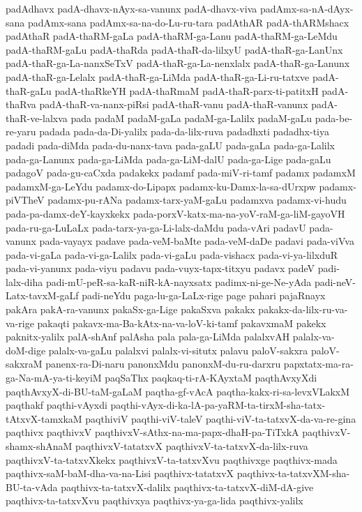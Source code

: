 {padAdhavx
padA-dhavx-nAyx-sa-vanunx
padA-dhavx-viva
padAmx-sa-nA-dAyx-sana
padAmx-sana
padAmx-sa-na-do-Lu-ru-tara
padAthAR
padA-thARMshacx
padAthaR
padA-thaRM-gaLa
padA-thaRM-ga-Lanu
padA-thaRM-ga-LeMdu
padA-thaRM-gaLu
padA-thaRda
padA-thaR-da-lilxyU
padA-thaR-ga-LanUnx
padA-thaR-ga-La-nanxSeTxV
padA-thaR-ga-La-nenxlalx
padA-thaR-ga-Lanunx
padA-thaR-ga-Lelalx
padA-thaR-ga-LiMda
padA-thaR-ga-Li-ru-tatxve
padA-thaR-gaLu
padA-thaRkeYH
padA-thaRmaM
padA-thaR-parx-ti-patitxH
padA-thaRva
padA-thaR-va-nanx-piRsi
padA-thaR-vanu
padA-thaR-vanunx
padA-thaR-ve-lalxva
pada
padaM
padaM-gaLa
padaM-ga-Lalilx
padaM-gaLu
pada-be-re-yaru
padada
pada-da-Di-yalilx
pada-da-lilx-ruva
padadhxti
padadhx-tiya
padadi
pada-diMda
pada-du-nanx-tava
pada-gaLU
pada-gaLa
pada-ga-Lalilx
pada-ga-Lanunx
pada-ga-LiMda
pada-ga-LiM-dalU
pada-ga-Lige
pada-gaLu
padagoV
pada-gu-caCxda
padakekx
padamf
pada-miV-ri-tamf
padamx
padamxM
padamxM-ga-LeYdu
padamx-do-Lipapx
padamx-ku-Damx-la-sa-dUrxpw
padamx-piVTheV
padamx-pu-rANa
padamx-tarx-yaM-gaLu
padamxva
padamx-vi-hudu
pada-pa-damx-deY-kayxkekx
pada-porxV-katx-ma-na-yoV-raM-ga-liM-gayoVH
pada-ru-ga-LuLaLx
pada-tarx-ya-ga-Li-lalx-daMdu
pada-vAri
padavU
pada-vanunx
pada-vayayx
padave
pada-veM-baMte
pada-veM-daDe
padavi
pada-viVva
pada-vi-gaLa
pada-vi-ga-Lalilx
pada-vi-gaLu
pada-vishacx
pada-vi-ya-lilxduR
pada-vi-yanunx
pada-viyu
padavu
pada-vuyx-tapx-titxyu
padavx
padeV
padi-lalx-diha
padi-mU-peR-sa-kaR-niR-kA-nayxsatx
padimx-ni-ge-Ne-yAda
padi-neV-Latx-tavxM-gaLf
padi-neYdu
paga-lu-ga-LaLx-rige
page
pahari
pajaRnayx
pakAra
pakA-ra-vanunx
pakaSx-ga-Lige
pakaSxva
pakakx
pakakx-da-lilx-ru-va-va-rige
pakaqti
pakavx-ma-Ba-kAtx-na-va-loV-ki-tamf
pakavxmaM
pakekx
paknitx-yalilx
palA-shAnf
palAsha
pala
pala-ga-LiMda
palalxvAH
palalx-va-doM-dige
palalx-va-gaLu
palalxvi
palalx-vi-situtx
palavu
paloV-sakxra
paloV-sakxraM
panenx-ra-Di-naru
panonxMdu
panonxM-du-ru-darxru
papxtatx-ma-ra-ga-Na-mA-ya-ti-keyiM
paqSaThx
paqkaq-ti-rA-KAyxtaM
paqthAvxyXdi
paqthAvxyX-di-BU-taM-gaLaM
paqtha-gf-vAcA
paqtha-kakx-ri-sa-levxVLakxM
paqthakf
paqthi-vAyxdi
paqthi-vAyx-di-ka-lA-pa-yaRM-ta-tirxM-sha-tatx-tAtxvX-tamxkaM
paqthiviV
paqthi-viV-taleV
paqthi-viV-ta-tatxvX-da-va-re-gina
paqthivx
paqthivxV
paqthivxV-sAthx-na-ma-papx-dhaH-pa-TiTxkA
paqthivxV-shamx-shAnaM
paqthivxV-tatatxvX
paqthivxV-ta-tatxvX-da-lilx-ruva
paqthivxV-ta-tatxvXkekx
paqthivxV-ta-tatxvXvu
paqthivxge
paqthivx-mada
paqthivx-saM-baM-dha-va-na-Lisi
paqthivx-tatatxvX
paqthivx-ta-tatxvXM-sha-BU-ta-vAda
paqthivx-ta-tatxvX-dalilx
paqthivx-ta-tatxvX-diM-dA-give
paqthivx-ta-tatxvXvu
paqthivxya
paqthivx-ya-ga-lida
paqthivx-yalilx
}

